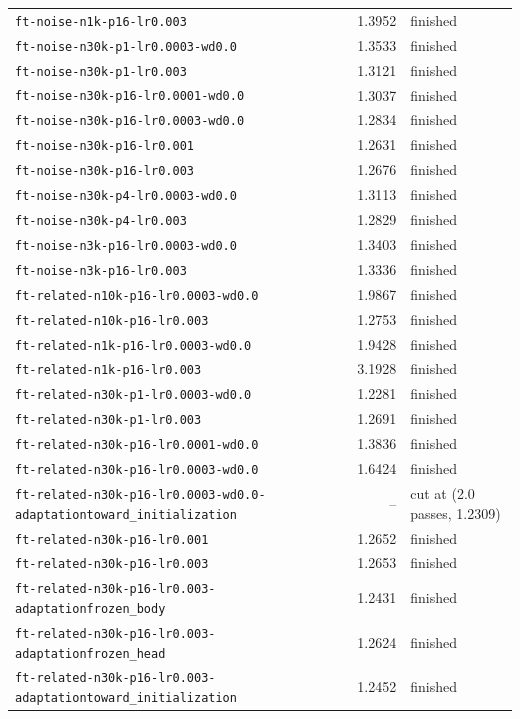 \begin{longtable}{lrl}
\texttt{ft-noise-n1k-p16-lr0.003} & 1.3952 & finished \\
\texttt{ft-noise-n30k-p1-lr0.0003-wd0.0} & 1.3533 & finished \\
\texttt{ft-noise-n30k-p1-lr0.003} & 1.3121 & finished \\
\texttt{ft-noise-n30k-p16-lr0.0001-wd0.0} & 1.3037 & finished \\
\texttt{ft-noise-n30k-p16-lr0.0003-wd0.0} & 1.2834 & finished \\
\texttt{ft-noise-n30k-p16-lr0.001} & 1.2631 & finished \\
\texttt{ft-noise-n30k-p16-lr0.003} & 1.2676 & finished \\
\texttt{ft-noise-n30k-p4-lr0.0003-wd0.0} & 1.3113 & finished \\
\texttt{ft-noise-n30k-p4-lr0.003} & 1.2829 & finished \\
\texttt{ft-noise-n3k-p16-lr0.0003-wd0.0} & 1.3403 & finished \\
\texttt{ft-noise-n3k-p16-lr0.003} & 1.3336 & finished \\
\texttt{ft-related-n10k-p16-lr0.0003-wd0.0} & 1.9867 & finished \\
\texttt{ft-related-n10k-p16-lr0.003} & 1.2753 & finished \\
\texttt{ft-related-n1k-p16-lr0.0003-wd0.0} & 1.9428 & finished \\
\texttt{ft-related-n1k-p16-lr0.003} & 3.1928 & finished \\
\texttt{ft-related-n30k-p1-lr0.0003-wd0.0} & 1.2281 & finished \\
\texttt{ft-related-n30k-p1-lr0.003} & 1.2691 & finished \\
\texttt{ft-related-n30k-p16-lr0.0001-wd0.0} & 1.3836 & finished \\
\texttt{ft-related-n30k-p16-lr0.0003-wd0.0} & 1.6424 & finished \\
\texttt{ft-related-n30k-p16-lr0.0003-wd0.0-adaptationtoward\_initialization} & -- & cut at (2.0 passes, 1.2309) \\
\texttt{ft-related-n30k-p16-lr0.001} & 1.2652 & finished \\
\texttt{ft-related-n30k-p16-lr0.003} & 1.2653 & finished \\
\texttt{ft-related-n30k-p16-lr0.003-adaptationfrozen\_body} & 1.2431 & finished \\
\texttt{ft-related-n30k-p16-lr0.003-adaptationfrozen\_head} & 1.2624 & finished \\
\texttt{ft-related-n30k-p16-lr0.003-adaptationtoward\_initialization} & 1.2452 & finished \\

\end{longtable}
